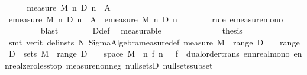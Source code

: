 \begin{isabellebody}
\ \ \isamarkupfalse%
\ \isamarkupfalse%
\ {\isachardoublequoteopen}measure\ M\ {\isacharparenleft}{\kern0pt}{\isasymInter}n{\isachardot}{\kern0pt}\ D\ n\ {\isasyminter}\ A{\isacharparenright}{\kern0pt}\ {\isacharequal}{\kern0pt}\ {}{\isachardoublequoteclose}\isanewline
\ \ \isamarkupfalse%
\ {\isacharminus}{\kern0pt}\isanewline
\ \ \ \ \isamarkupfalse%
\ {\isachardoublequoteopen}emeasure\ M\ {\isacharparenleft}{\kern0pt}{\isasymInter}n{\isachardot}{\kern0pt}\ D\ n\ {\isasyminter}\ A{\isacharparenright}{\kern0pt}\ {\isasymle}\ emeasure\ M\ {\isacharparenleft}{\kern0pt}{\isasymInter}n{\isachardot}{\kern0pt}\ D\ n{\isacharparenright}{\kern0pt}{\isachardoublequoteclose}\isanewline
\ \ \ \ \ \ \isamarkupfalse%
\ {\isacharparenleft}{\kern0pt}rule\ emeasure{\isacharunderscore}{\kern0pt}mono{\isacharparenright}{\kern0pt}\isanewline
\ \ \ \ \ \ \ \isamarkupfalse%
\ blast\isanewline
\ \ \ \ \ \ \isamarkupfalse%
\ D{\isacharunderscore}{\kern0pt}def\ \isamarkupfalse%
\ measurable\isanewline
\ \ \ \ \ \ \isamarkupfalse%
\isanewline
\ \ \ \ \isamarkupfalse%
\ \isamarkupfalse%
\ {\isacharquery}{\kern0pt}thesis\isanewline
\ \ \ \ \ \ \isamarkupfalse%
\ {\isacharparenleft}{\kern0pt}smt\ {\isacharparenleft}{\kern0pt}verit{\isacharcomma}{\kern0pt}\ del{\isacharunderscore}{\kern0pt}insts{\isacharparenright}{\kern0pt}\ N\ Sigma{\isacharunderscore}{\kern0pt}Algebra{\isachardot}{\kern0pt}measure{\isacharunderscore}{\kern0pt}def\ {\isacartoucheopen}measure\ M\ {\isacharparenleft}{\kern0pt}{\isasymInter}\ {\isacharparenleft}{\kern0pt}range\ D{\isacharparenright}{\kern0pt}{\isacharparenright}{\kern0pt}\ {\isacharequal}{\kern0pt}\ {}{\isacartoucheclose}\ {\isacartoucheopen}{\isasymInter}\ {\isacharparenleft}{\kern0pt}range\ D{\isacharparenright}{\kern0pt}\ {\isasymin}\ sets\ M{\isacartoucheclose}\ {\isacartoucheopen}{\isasymInter}\ {\isacharparenleft}{\kern0pt}range\ D{\isacharparenright}{\kern0pt}\ {\isasymsubseteq}\ {\isacharbraceleft}{\kern0pt}{\isasymomega}\ {\isasymin}\ space\ M{\isachardot}{\kern0pt}\ {\isasymnot}\ {\isacharparenleft}{\kern0pt}{\isasymlambda}n{\isachardot}{\kern0pt}\ f{\isacharprime}{\kern0pt}\ n\ {\isasymomega}{\isacharparenright}{\kern0pt}\ {\isasymlonglonglongrightarrow}\ f\ {\isasymomega}{\isacharbraceright}{\kern0pt}{\isacartoucheclose}\ dual{\isacharunderscore}{\kern0pt}order{\isachardot}{\kern0pt}trans\ enn{}real{\isacharunderscore}{\kern0pt}mono\ ennreal{\isacharunderscore}{\kern0pt}zero{\isacharunderscore}{\kern0pt}less{\isacharunderscore}{\kern0pt}top\ measure{\isacharunderscore}{\kern0pt}nonneg\ null{\isacharunderscore}{\kern0pt}setsD{}\ null{\isacharunderscore}{\kern0pt}sets{\isacharunderscore}{\kern0pt}subset{\isacharparenright}{\kern0pt}\isanewline

\end{isabellebody}
